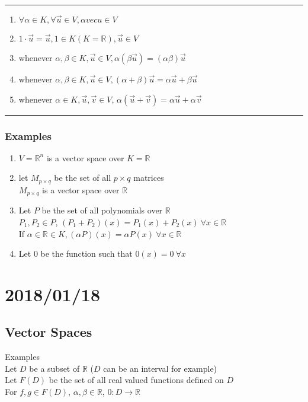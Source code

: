 \documentclass[12pt]{article}
\renewcommand{\v}[1]{\overrightarrow{#1}}
\newcommand{\real}[0]{\mathbb{R}}
\newcommand{\pp}[1]{\left(#1\right)}
\newcommand{\divider}[0]{\textcolor{lightgray}{\rule{\textwidth}{0.1pt}}}
\begin{document}
\divider

\begin{enumerate}[label=\(S_{\arabic*}\)]
	\item \(\forall \alpha \in K, \forall \v{u} \in V, \alpha vec{u} \in V\)
	\item \(1 \cdot \v{u} = \v{u}, 1 \in K(K = \real), \v{u} \in V\)
	\item whenever \(\alpha, \beta \in K, \v{u} \in V, \alpha \pp{\beta \v{u}} = \pp{\alpha \beta} \v{u}\)
	\item whenever \(\alpha, \beta \in K, \v{u} \in V, \pp{\alpha + \beta}\v{u} = \alpha \v{u} + \beta \v{u}\)
	\item whenever \(\alpha \in K, \v{u}, \v{v} \in V\), \(\alpha \pp{\v{u} + \v{v}} = \alpha \v{u} + \alpha \v{v}\)
\end{enumerate}

\divider

\subsubsection{Examples}

\begin{enumerate}
	\item \(V = \real^n\) is a vector space over \(K = \real\)
	\item let \(M_{p \times q}\) be the set of all \(p \times q\) matrices \\
	\(M_{p \times q}\) is a vector space over \(\real\)
	\item Let \(P\) be the set of all polynomials over \(\real\) \\
	\(P_1, P_2 \in P\), \(\pp{P_1 + P_2}(x) = P_1(x) + P_2(x) \ \forall x \in \real\) \\
	If \(\alpha \in \real \in K, \pp{\alpha P}(x) = \alpha P(x) \ \forall x \in \real\)
	\item Let \(0\) be the function such that \(0(x) = 0 \ \forall x\) 
\end{enumerate}

\section{2018/01/18}

\subsection{Vector Spaces}

Examples \\
Let $D$ be a subset of $\real$ ($D$ can be an interval for example) \\
Let $F(D)$ be the set of all real valued functions defined on $D$ \\
For $f, g \in F(D)$, $\alpha, \beta \in \real$, $0 : D \rightarrow \real$
\end{document}
